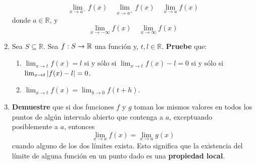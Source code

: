 \documentclass[12pt]{article}
\begin{document}
\begin{enumerate}
    \begin{equation*}
        \lim_{ x\rightarrow a^-}f(x)\quad\lim_{ x\rightarrow a^+}f(x)\quad\lim_{ x\rightarrow a}f(x)
    \end{equation*}
    donde $a\in\mathbb{R}$, y
    \begin{equation*}
        \lim_{ x\rightarrow-\infty}f(x)\quad\lim_{ x\rightarrow\infty}f(x)
    \end{equation*}
    \item Sea $S\subseteq\mathbb{R}$. Sea $f:S\rightarrow\mathbb{R}$ una función y, $t,l\in\mathbb{R}$. \textbf{Pruebe} que:
    \begin{enumerate}
        \item $\lim_{ x\rightarrow t}f(x)=l$ si y sólo si $\lim_{ x\rightarrow t}f(x)-l=0$ si y sólo si $\lim_{ x\rightarrow t}\left| f(x)-l \right|=0$.
        \item $\lim_{ x\rightarrow t}f(x)=\lim_{ h\rightarrow 0}f(t+h)$.
    \end{enumerate}
    \item \textbf{Demuestre} que si dos funciones $f$ y $g$ toman los mismos valores en todos los puntos de algún intervalo abierto que contenga a $a$, exceptuando posiblemente a $a$, entonces
    \begin{equation*}
        \lim_{ x\rightarrow a}f(x)=\lim_{ x\rightarrow a}g(x)
    \end{equation*}
    cuando alguno de los dos límites exista. Esto significa que la existencia del límite de alguna función en un punto dado es una \textbf{propiedad local}.


\end{enumerate}
\end{document}
